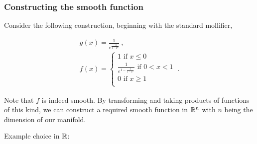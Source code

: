 \begin{frame}
    \frametitle{Constructing the smooth function}

    Consider the following construction, beginning with the standard mollifier, 
    
    \begin{gather*}
        g(x) = \frac{1}{e^{\frac{-1}{1-x^2}}}~, \\
        f(x) = \begin{cases}
            1 \text{ if } x \leq 0 \\
            \frac{1}{e^{1 - \frac{1}{1-x^2}}} \text{ if } 0 < x < 1 \\
            0 \text{ if } x \geq 1 \\
        \end{cases}~.
    \end{gather*} \pause

    Note that \(f\) is indeed smooth. By transforming and taking products of
    functions of this kind, we can construct a required smooth function in
    \(\mathbb{R}^n\) with \(n\) being the dimension of our manifold.

\end{frame}

\begin{frame}

    Example choice in \(\mathbb{R}\):
    
    \begin{center}
    \end{center}

\end{frame}

